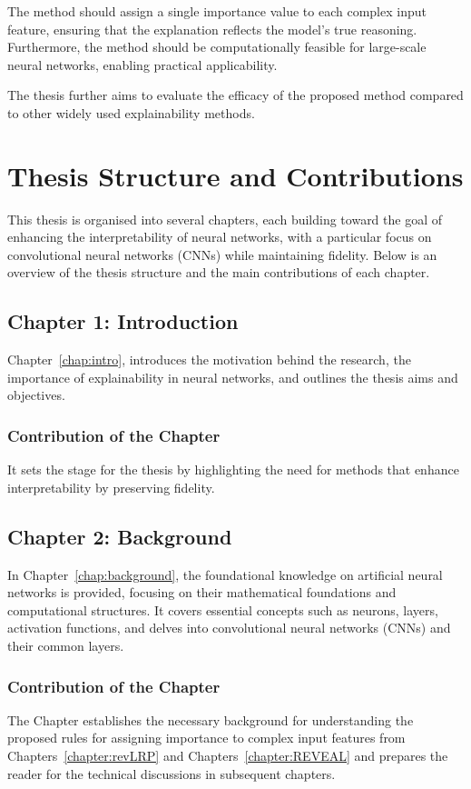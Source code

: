 The method should assign a single importance value to each complex input feature, ensuring that the explanation reflects the model's true reasoning. Furthermore, the method should be computationally feasible for large-scale neural networks, enabling practical applicability.

The thesis further aims to evaluate the efficacy of the proposed method compared to other widely used explainability methods.

\section{Thesis Structure and Contributions}

This thesis is organised into several chapters, each building toward the goal of enhancing the interpretability of neural networks, with a particular focus on convolutional neural networks (CNNs) while maintaining fidelity. Below is an overview of the thesis structure and the main contributions of each chapter.

\subsection{Chapter 1: Introduction}

Chapter~\ref{chap:intro}, introduces the motivation behind the research, the importance of explainability in neural networks, and outlines the thesis aims and objectives.

\subsubsection*{Contribution of the Chapter}
It sets the stage for the thesis by highlighting the need for methods that enhance interpretability by preserving fidelity.

\subsection{Chapter 2: Background}

In Chapter~\ref{chap:background}, the foundational knowledge on artificial neural networks is provided, focusing on their mathematical foundations and computational structures. It covers essential concepts such as neurons, layers, activation functions, and delves into convolutional neural networks (CNNs) and their common layers.

\subsubsection*{Contribution of the Chapter}
The Chapter establishes the necessary background for understanding the proposed rules for assigning importance to complex input features from Chapters~\ref{chapter:revLRP} and Chapters~\ref{chapter:REVEAL} and prepares the reader for the technical discussions in subsequent chapters.

